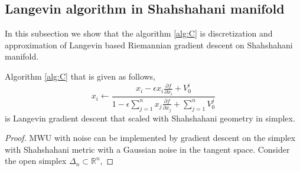 \subsection{Langevin algorithm in Shahshahani manifold}
In this subsection we show that the algorithm \ref{alg:C} is discretization and approximation of Langevin based Riemannian gradient descent on Shahshahani manifold.
\begin{proposition}
Algorithm \ref{alg:C} that is given as follows,
\[
x_i\leftarrow\frac{x_i-\epsilon x_i\frac{\partial f}{\partial x_i}+V_0^i}{1-\epsilon\sum_{j=1}^nx_j\frac{\partial f}{\partial x_j}+\sum_{j=1}^nV_0^j}
\]
is Langevin gradient descent that scaled with Shahshahani geometry in simplex.
\end{proposition}
\begin{proof}
MWU with noise can be implemented by gradient descent on the simplex with Shahshahani metric with a Gaussian noise in the tangent space. Consider the open simplex $\Delta_n\subset\mathbb{R}^{n}$,


\end{proof}
